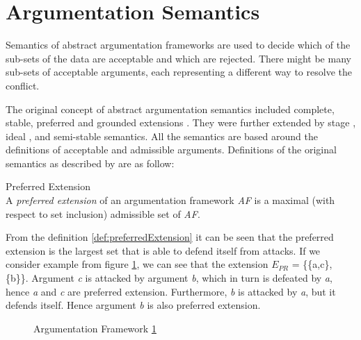 \section{Argumentation Semantics}
\label{sec:argumentationSemantics}
Semantics of abstract argumentation frameworks are used to decide which of the sub-sets of the data are acceptable and which are rejected. There might be many sub-sets of acceptable arguments, each representing a different way to resolve the conflict.

The original concept of abstract argumentation semantics included complete, stable, preferred and grounded extensions \citep{dung1995}. They were further extended by stage \citep{verheij1996two}, ideal \citep{dung2007computing}, and semi-stable \citep{caminada2006semi} semantics. All the semantics are based around the definitions of acceptable and admissible arguments. Definitions of the original semantics as described by \citet{dung1995} are as follow: 

\begin{definition}{Preferred Extension}
\label{def:preferredExtension}\\
A \textit{preferred extension} of an argumentation framework \textit{AF} is a maximal (with respect to set inclusion) admissible set of \textit{AF}.
\end{definition}


From the definition \ref{def:preferredExtension} it can be seen that the preferred extension is the largest set that is able to defend itself from attacks. If we consider example from figure \ref{fig:af1}, we can see that the extension \textit{$E_{PR}$} = \{\{a,c\}, \{b\}\}. Argument \textit{c} is attacked by argument \textit{b}, which in turn is defeated by \textit{a}, hence \textit{a} and \textit{c} are preferred extension. Furthermore, \textit{b} is attacked by \textit{a}, but it defends itself. Hence argument \textit{b} is also preferred extension.

\begin{figure}[h]
\centering
{}
\caption{Argumentation Framework \ref{fig:af1}}
\label{fig:af1}
\end{figure}

